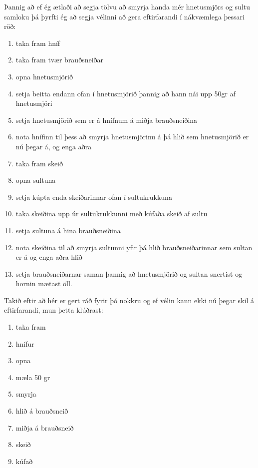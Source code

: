 Þannig að ef ég ætlaði að segja tölvu að smyrja handa mér hnetusmjörs og sultu samloku þá þyrfti ég að segja vélinni að gera eftirfarandi í nákvæmlega þessari röð:
\vspace{0.4cm}
\begin{enumerate}
	\item taka fram hníf
	\item taka fram tvær brauðsneiðar
	\item opna hnetusmjörið
	\item setja beitta endann ofan í hnetusmjörið þannig að hann nái upp 50gr af hnetusmjöri
	\item setja hnetusmjörið sem er á hnífnum á miðja brauðsneiðina
	\item nota hnífinn til þess að smyrja hnetusmjörinu á þá hlið sem hnetusmjörið er nú þegar á, og enga aðra
	\item taka fram skeið
	\item opna sultuna
	\item setja kúpta enda skeiðarinnar ofan í sultukrukkuna 
	\item taka skeiðina upp úr sultukrukkunni með kúfaða skeið af sultu
	\item setja sultuna á hina brauðsneiðina
	\item nota skeiðina til að smyrja sultunni yfir þá hlið brauðsneiðarinnar sem sultan er á og enga aðra hlið
	\item  setja brauðsneiðarnar saman þannig að hnetusmjörið og sultan snertist og hornin mætast öll. 
\end{enumerate} 
\vspace{0.4cm}
Takið eftir að hér er gert ráð fyrir þó nokkru og ef vélin kann ekki nú þegar skil á eftirfarandi, mun þetta klúðrast: 
\vspace{0.2cm}
\begin{enumerate}
	\item taka fram
	\item hnífur
	\item opna
	\item mæla 50 gr
	\item smyrja
	\item hlið á brauðsneið
	\item miðja á brauðsneið
	\item skeið
	\item kúfað
\end{enumerate} 
\vspace{0.2cm}


